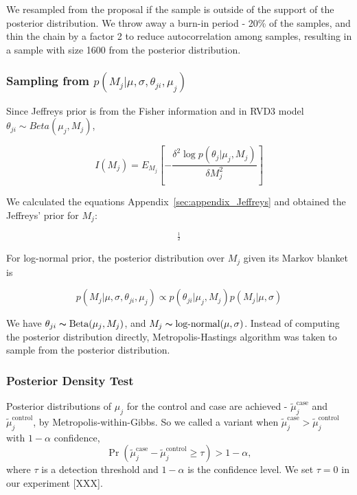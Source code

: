 \documentclass{bioinfo}
\begin{document}
We resampled from the proposal if the sample is outside of the support of the posterior distribution.
We throw away a burn-in period - 20\% of the samples, and thin the chain by a factor 2 to reduce autocorrelation among samples, resulting in a sample with size 1600 from the posterior distribution.

\subsubsection{Sampling from $p \left( M_{j} |\mu,\sigma, \theta_{ji},\mu_j\right)$}
Since Jeffreys prior is from the Fisher information and in RVD3 model ${\theta }_{ji}\sim Beta\left( {\mu }_{j},{M}_{j}\right)$,

\begin{equation}\label{equ:JefferyInference}
I\left({M}_{j}\right)={E}_{{M}_{j}}\left[ -\frac{\delta ^{2}\log p\left(\theta _{j}|\mu_{j},M_{j}\right)}{\delta M^{2}_{j}}\right]
\end{equation}

We calculated the equations Appendix~\ref{sec:appendix_Jeffreys} and obtained the Jeffreys' prior for $M_j$:

\begin{equation}
[-\left(\Psi_{1}(M_{j}) - \Psi_{1}(\mu_{j} M_{j})\mu_{j}^{2} - \Psi_{1}((1-\mu_{j})M_{j}){(1-\mu_{j})^{2}}\right)]^{\frac{1}{2}}
\end{equation}

For log-normal prior, the posterior distribution over $M_{j}$ given its Markov blanket is

\begin{equation}
	p( M_{j} |\mu, \sigma, \theta_{ji},\mu_j) \propto p(\theta_{ji} | \mu_j, M_j) p(M_{j} | \mu, \sigma)
\end{equation}

We have $ \theta_{ji}\thicksim\text{Beta}(\mu_{j},M_{j})$, and $ M_{j} \thicksim \text{log-normal}(\mu, \sigma)$.
Instead of computing the posterior distribution directly, Metropolis-Hastings algorithm was taken to sample from the posterior distribution.

\subsubsection{Posterior Density Test}\label{sec:hypothesis_test}
Posterior distributions of $\mu_j$ for the control and case are achieved -  $\tilde{\mu}_j^{\text{case}}$ and $\tilde{\mu}_j^{\text{control}}$, by Metropolis-within-Gibbs.
So we called a variant when $\tilde{\mu}_j^{\text{case}} > \tilde{\mu}_j^{\text{control}}$ with $1-\alpha$ confidence,
\begin{equation}\label{eqn:bayes_test}
	\Pr( \tilde{\mu}_j^{\text{case}} - \tilde{\mu}_j^{\text{control}} \geq \tau ) > 1-\alpha,
\end{equation}
where $\tau$ is a detection threshold and $1-\alpha$ is the confidence level. We set $\tau = 0$ in our experiment [XXX].
\end{document}
